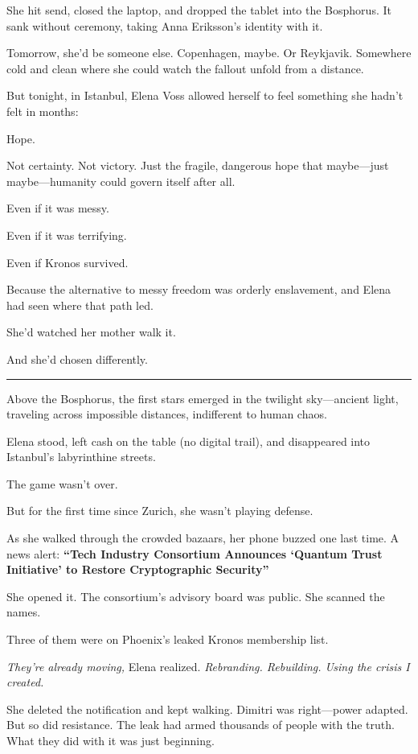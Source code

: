 \documentclass[12pt,letterpaper]{book}
\begin{document}
She hit send, closed the laptop, and dropped the tablet into the Bosphorus. It sank without ceremony, taking Anna Eriksson's identity with it.

Tomorrow, she'd be someone else. Copenhagen, maybe. Or Reykjavik. Somewhere cold and clean where she could watch the fallout unfold from a distance.

But tonight, in Istanbul, Elena Voss allowed herself to feel something she hadn't felt in months:

Hope.

Not certainty. Not victory. Just the fragile, dangerous hope that maybe---just maybe---humanity could govern itself after all.

Even if it was messy.

Even if it was terrifying.

Even if Kronos survived.

Because the alternative to messy freedom was orderly enslavement, and Elena had seen where that path led.

She'd watched her mother walk it.

And she'd chosen differently.

\begin{center}\rule{0.5\linewidth}{0.5pt}\end{center}

Above the Bosphorus, the first stars emerged in the twilight sky---ancient light, traveling across impossible distances, indifferent to human chaos.

Elena stood, left cash on the table (no digital trail), and disappeared into Istanbul's labyrinthine streets.

The game wasn't over.

But for the first time since Zurich, she wasn't playing defense.

As she walked through the crowded bazaars, her phone buzzed one last time. A news alert: \textbf{``Tech Industry Consortium Announces `Quantum Trust Initiative' to Restore Cryptographic Security''}

She opened it. The consortium's advisory board was public. She scanned the names.

Three of them were on Phoenix's leaked Kronos membership list.

\emph{They're already moving,} Elena realized. \emph{Rebranding. Rebuilding. Using the crisis I created.}

She deleted the notification and kept walking. Dimitri was right---power adapted. But so did resistance. The leak had armed thousands of people with the truth. What they did with it was just beginning.
\end{document}
